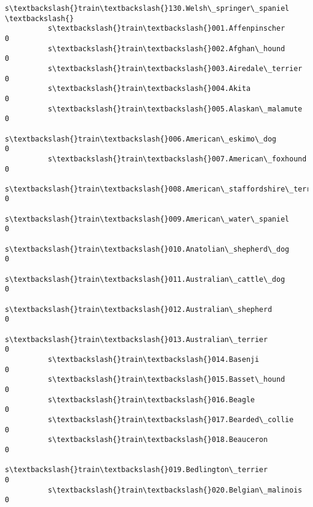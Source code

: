 \documentclass[11pt]{article}
\begin{document}
\begin{Verbatim}[commandchars=\\\{\}]
                                                          s\textbackslash{}train\textbackslash{}130.Welsh\_springer\_spaniel  \textbackslash{}
          s\textbackslash{}train\textbackslash{}001.Affenpinscher                                                        0   
          s\textbackslash{}train\textbackslash{}002.Afghan\_hound                                                         0   
          s\textbackslash{}train\textbackslash{}003.Airedale\_terrier                                                     0   
          s\textbackslash{}train\textbackslash{}004.Akita                                                                0   
          s\textbackslash{}train\textbackslash{}005.Alaskan\_malamute                                                     0   
          s\textbackslash{}train\textbackslash{}006.American\_eskimo\_dog                                                  0   
          s\textbackslash{}train\textbackslash{}007.American\_foxhound                                                    0   
          s\textbackslash{}train\textbackslash{}008.American\_staffordshire\_terrier                                       0   
          s\textbackslash{}train\textbackslash{}009.American\_water\_spaniel                                               0   
          s\textbackslash{}train\textbackslash{}010.Anatolian\_shepherd\_dog                                               0   
          s\textbackslash{}train\textbackslash{}011.Australian\_cattle\_dog                                                0   
          s\textbackslash{}train\textbackslash{}012.Australian\_shepherd                                                  0   
          s\textbackslash{}train\textbackslash{}013.Australian\_terrier                                                   0   
          s\textbackslash{}train\textbackslash{}014.Basenji                                                              0   
          s\textbackslash{}train\textbackslash{}015.Basset\_hound                                                         0   
          s\textbackslash{}train\textbackslash{}016.Beagle                                                               0   
          s\textbackslash{}train\textbackslash{}017.Bearded\_collie                                                       0   
          s\textbackslash{}train\textbackslash{}018.Beauceron                                                            0   
          s\textbackslash{}train\textbackslash{}019.Bedlington\_terrier                                                   0   
          s\textbackslash{}train\textbackslash{}020.Belgian\_malinois                                                     0   

\end{Verbatim}
\end{document}
